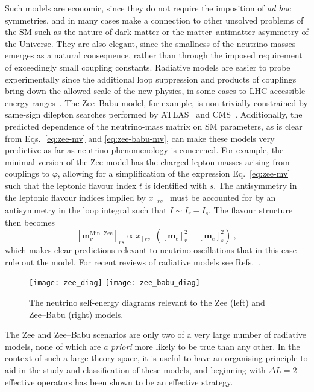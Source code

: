 Such models are economic, since they do not require the imposition of \textit{ad
  hoc} symmetries, and in many cases make a connection to other unsolved
problems of the SM such as the nature of dark matter or the matter--antimatter
asymmetry of the Universe. They are also elegant, since the smallness of the
neutrino masses emerges as a natural consequence, rather than through the
imposed requirement of exceedingly small coupling constants. Radiative models
are easier to probe experimentally since the additional loop suppression and
products of couplings bring down the allowed scale of the new physics, in some
cases to LHC-accessible energy ranges~\cite{deGouvea:2007qla}. The Zee--Babu
model, for example, is non-trivially constrained by same-sign dilepton searches
performed by ATLAS~\cite{ATLAS:2012hi, ATLAS:2014kca, Aaboud:2017qph} and
CMS~\cite{Chatrchyan:2012ya, CMS:2016cpz, CMS:2017pet}. Additionally, the
predicted dependence of the neutrino-mass matrix on SM parameters, as is clear
from Eqs.~\eqref{eq:zee-mv} and \eqref{eq:zee-babu-mv}, can make these models
very predictive as far as neutrino phenomenology is concerned. For example, the
minimal version of the Zee model has the charged-lepton masses arising from
couplings to $\varphi$, allowing for a simplification of the expression
Eq.~\eqref{eq:zee-mv} such that the leptonic flavour index $t$ is identified
with $s$. The antisymmetry in the leptonic flavour indices implied by $x_{[rs]}$
must be accounted for by an antisymmetry in the loop integral such that
$I \sim I_{r} - I_{s}$. The flavour structure then
becomes~\cite{Wolfenstein:1980sy}
\begin{equation}
  \label{eq:zee-wolfenstein-mv}
  [\mathbf{m}_{\nu}^{\text{Min. Zee}}]_{rs} \propto x_{[rs]} ([\mathbf{m}_{e}]_{r}^{2} - [\mathbf{m}_{e}]_{s}^{2}) \ ,
\end{equation}
which makes clear predictions relevant to neutrino oscillations that in this
case rule out the model. For recent reviews of radiative models see
Refs.~\cite{Boucenna:2014zba, Cai:2017jrq}.

\begin{figure}[t]
  \centering
  \texttt{[image: zee\_diag]}
  \texttt{[image: zee\_babu\_diag]}
  \caption{The neutrino self-energy diagrams relevant to the Zee (left) and
    Zee--Babu (right) models.}
  \label{fig:zee-and-zee-babu-diags}
\end{figure}

The Zee and Zee--Babu scenarios are only two of a very large number of radiative
models, none of which are \textit{a priori} more likely to be true than any
other. In the context of such a large theory-space, it is useful to have an
organising principle to aid in the study and classification of these models, and
beginning with $\Delta L = 2$ effective operators has been shown to be an
effective strategy.

